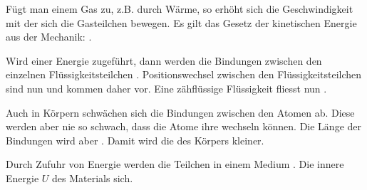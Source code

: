 
\StartLueckentext
Fügt man einem Gas  zu, z.B. durch Wärme, so erhöht sich die Geschwindigkeit mit der sich die Gasteilchen bewegen.
Es gilt das Gesetz der kinetischen Energie aus der Mechanik: .

Wird einer  Energie zugeführt, dann werden die Bindungen zwischen den einzelnen Flüssigkeitsteilchen .
Positionswechsel zwischen den Flüssigkeitsteilchen sind nun  und kommen daher  vor.
Eine zähflüssige Flüssigkeit fliesst nun .

Auch in  Körpern schwächen sich die Bindungen zwischen den Atomen ab.
Diese werden aber nie so schwach, dass die Atome ihre  wechseln können.
Die Länge der Bindungen wird aber . Damit wird die  des Körpers kleiner.


Durch Zufuhr von Energie werden die Teilchen in einem Medium . Die innere Energie $U$ des Materials  sich.

\StoppLueckentext
